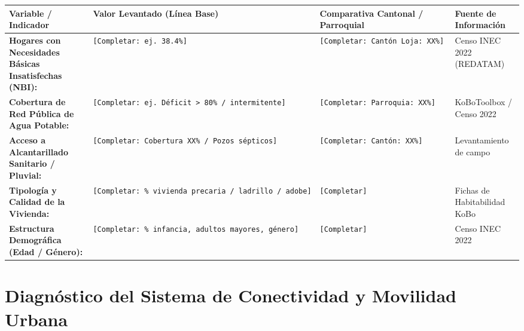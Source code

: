 \documentclass[
  letterpaper,
  DIV=11,
  numbers=noendperiod]{scrreprt}
\newcounter{none} %
\begin{document}
{\def\LTcaptype{none} %
\begin{longtable}[]{@{}
  >{\raggedright\arraybackslash}p{}
  >{\raggedright\arraybackslash}p{}
  >{\raggedright\arraybackslash}p{}
  >{\raggedright\arraybackslash}p{}@{}}
\toprule\noalign{}
\begin{minipage}[b]{\linewidth}\raggedright
Variable / Indicador
\end{minipage} & \begin{minipage}[b]{\linewidth}\raggedright
Valor Levantado (Línea Base)
\end{minipage} & \begin{minipage}[b]{\linewidth}\raggedright
Comparativa Cantonal / Parroquial
\end{minipage} & \begin{minipage}[b]{\linewidth}\raggedright
Fuente de Información
\end{minipage} \\
\midrule\noalign{}
\endhead
\bottomrule\noalign{}
\endlastfoot
\textbf{Hogares con Necesidades Básicas Insatisfechas (NBI):} &
\texttt{{[}Completar:\ ej.\ 38.4\%{]}} &
\texttt{{[}Completar:\ Cantón\ Loja:\ XX\%{]}} & Censo INEC 2022
(REDATAM) \\
\textbf{Cobertura de Red Pública de Agua Potable:} &
\texttt{{[}Completar:\ ej.\ Déficit\ \textgreater{}\ 80\%\ /\ intermitente{]}}
& \texttt{{[}Completar:\ Parroquia:\ XX\%{]}} & KoBoToolbox / Censo
2022 \\
\textbf{Acceso a Alcantarillado Sanitario / Pluvial:} &
\texttt{{[}Completar:\ Cobertura\ XX\%\ /\ Pozos\ sépticos{]}} &
\texttt{{[}Completar:\ Cantón:\ XX\%{]}} & Levantamiento de campo \\
\textbf{Tipología y Calidad de la Vivienda:} &
\texttt{{[}Completar:\ \%\ vivienda\ precaria\ /\ ladrillo\ /\ adobe{]}}
& \texttt{{[}Completar{]}} & Fichas de Habitabilidad KoBo \\
\textbf{Estructura Demográfica (Edad / Género):} &
\texttt{{[}Completar:\ \%\ infancia,\ adultos\ mayores,\ género{]}} &
\texttt{{[}Completar{]}} & Censo INEC 2022 \\
\end{longtable}
}

\section{Diagnóstico del Sistema de Conectividad y Movilidad
Urbana}\label{diagnuxf3stico-del-sistema-de-conectividad-y-movilidad-urbana}
\end{document}
